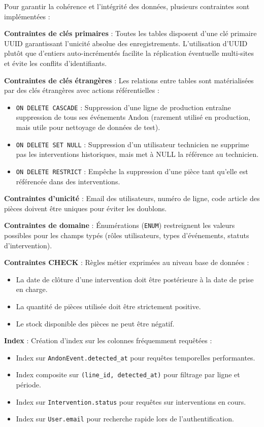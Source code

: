 Pour garantir la cohérence et l'intégrité des données, plusieurs contraintes sont implémentées :

\textbf{Contraintes de clés primaires} : Toutes les tables disposent d'une clé primaire UUID garantissant l'unicité absolue des enregistrements. L'utilisation d'UUID plutôt que d'entiers auto-incrémentés facilite la réplication éventuelle multi-sites et évite les conflits d'identifiants.

\textbf{Contraintes de clés étrangères} : Les relations entre tables sont matérialisées par des clés étrangères avec actions référentielles :

\begin{itemize}
    \item \texttt{ON DELETE CASCADE} : Suppression d'une ligne de production entraîne suppression de tous ses événements Andon (rarement utilisé en production, mais utile pour nettoyage de données de test).
    \item \texttt{ON DELETE SET NULL} : Suppression d'un utilisateur technicien ne supprime pas les interventions historiques, mais met à NULL la référence au technicien.
    \item \texttt{ON DELETE RESTRICT} : Empêche la suppression d'une pièce tant qu'elle est référencée dans des interventions.
\end{itemize}

\textbf{Contraintes d'unicité} : Email des utilisateurs, numéro de ligne, code article des pièces doivent être uniques pour éviter les doublons.

\textbf{Contraintes de domaine} : Énumérations (\texttt{ENUM}) restreignent les valeurs possibles pour les champs typés (rôles utilisateurs, types d'événements, statuts d'intervention).

\textbf{Contraintes CHECK} : Règles métier exprimées au niveau base de données :

\begin{itemize}
    \item La date de clôture d'une intervention doit être postérieure à la date de prise en charge.
    \item La quantité de pièces utilisée doit être strictement positive.
    \item Le stock disponible des pièces ne peut être négatif.
\end{itemize}

\textbf{Index} : Création d'index sur les colonnes fréquemment requêtées :

\begin{itemize}
    \item Index sur \texttt{AndonEvent.detected\_at} pour requêtes temporelles performantes.
    \item Index composite sur \texttt{(line\_id, detected\_at)} pour filtrage par ligne et période.
    \item Index sur \texttt{Intervention.status} pour requêtes sur interventions en cours.
    \item Index sur \texttt{User.email} pour recherche rapide lors de l'authentification.
\end{itemize}

